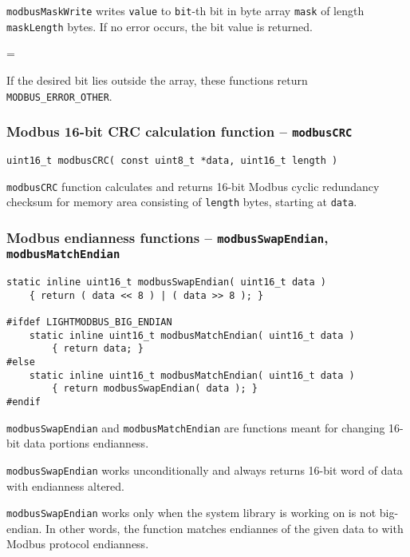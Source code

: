 \documentclass[11pt,a4paper]{article}
\newenvironment{warning}
{
	\par\begin{mdframed}[linewidth=0.5pt,linecolor=black]%
	\begin{list}{}{\leftmargin=1cm
	\labelwidth=\leftmargin}\item[\Large\ding{43}]
}
{	
	\end{list}\end{mdframed}\par
}
\newcommand{\warnbox}[1]{\vspace{0.2cm}\begin{warning}{#1}\end{warning}\vspace{0.2cm}}
\begin{document}
\texttt{modbusMaskWrite} writes \texttt{value} to \texttt{bit}-th bit in byte array \texttt{mask} of length \texttt{maskLength} bytes. If no error occurs, the bit value is returned. \newline

\warnbox{If the desired bit lies outside the array, these functions return \texttt{MODBUS\_ERROR\_OTHER}.}

\subsubsection{Modbus 16-bit CRC calculation function -- \texttt{modbusCRC}}
\begin{lstlisting}[style=cproto]
uint16_t modbusCRC( const uint8_t *data, uint16_t length )
\end{lstlisting}

\texttt{modbusCRC} function calculates and returns 16-bit Modbus cyclic redundancy checksum for memory area consisting of \texttt{length} bytes, starting at \texttt{data}.


\subsubsection{Modbus endianness functions -- \texttt{modbusSwapEndian}, \texttt{modbusMatchEndian}}
\begin{lstlisting}[style=cstyle]
static inline uint16_t modbusSwapEndian( uint16_t data ) 
	{ return ( data << 8 ) | ( data >> 8 ); }

#ifdef LIGHTMODBUS_BIG_ENDIAN
	static inline uint16_t modbusMatchEndian( uint16_t data ) 
		{ return data; }
#else
	static inline uint16_t modbusMatchEndian( uint16_t data ) 
		{ return modbusSwapEndian( data ); }
#endif
\end{lstlisting}

\texttt{modbusSwapEndian} and \texttt{modbusMatchEndian} are functions meant for changing 16-bit data portions endianness. \newline

\texttt{modbusSwapEndian} works unconditionally and always returns 16-bit word of data with endianness altered. \newline

\texttt{modbusSwapEndian} works only when the system library is working on is not big-endian. In other words, the function matches endiannes of the given data to with Modbus protocol endianness. 
\end{document}
